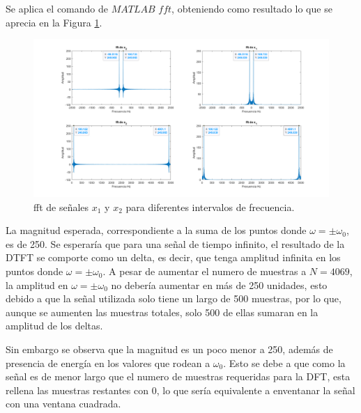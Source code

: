 \documentclass[letterpaper,onecolumn,10pt,journal,final]{IEEEtran}
\begin{document}
\begin{enumerate}[1)]
Se aplica el comando de $MATLAB$ $fft$, obteniendo como resultado%
lo que se aprecia en la Figura \ref{fig:I2}.
\begin{figure}[H]
\centering
\includegraphics[width=1 \linewidth]{Figuras/I2)a.png}
\caption{fft de señales $x_1$ y $x_2$ para diferentes intervalos de frecuencia.}
\label{fig:I2}
\end{figure}

La magnitud esperada, correspondiente a la suma de los puntos donde $\omega = \pm \omega _0$, es de 250. Se esperaría que para una señal de tiempo infinito, el resultado de la DTFT se comporte como un delta, es decir, que tenga amplitud infinita en los puntos donde $\omega = \pm \omega _0$. A pesar de aumentar el numero de muestras a $N = 4069$, la amplitud en  $\omega = \pm \omega _0$ no debería aumentar en más de 250 unidades, esto debido a que la señal utilizada solo tiene un largo de 500 muestras, por lo que, aunque se aumenten las muestras totales, solo 500 de ellas sumaran en la amplitud de los deltas.

Sin embargo se observa que la magnitud es un poco menor a 250, además de presencia de energía en los valores que rodean a $\omega_0$. Esto se debe a que como la señal es de menor largo que el numero de muestras requeridas para la DFT, esta rellena las muestras restantes con $0$, lo que sería equivalente a enventanar la señal con una ventana cuadrada.

\newpage


\end{enumerate}
\end{document}
